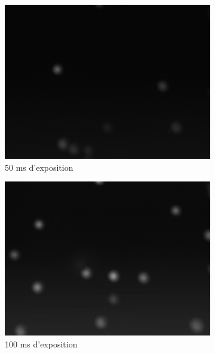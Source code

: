 \documentclass[11pt,letterpaper]{article}
\begin{document}
\begin{figure}[H]
  \begin{subfigure}{0.3\textwidth}
      \centering
      \includegraphics[width=\textwidth]{essai_10um_2im_50ms.png}
      \caption{50 ms d'exposition}
      \label{a}
  \end{subfigure}
  \hfill
  \begin{subfigure}{0.3\textwidth}
      \centering
      \includegraphics[width=\textwidth]{essai_10um_2im_100ms.png}
      \caption{100 ms d'exposition}
      \label{b}
  \end{subfigure}
  \hfill
  \begin{subfigure}{0.3\textwidth}
    \centering

\end{subfigure}
\end{figure}
\end{document}

